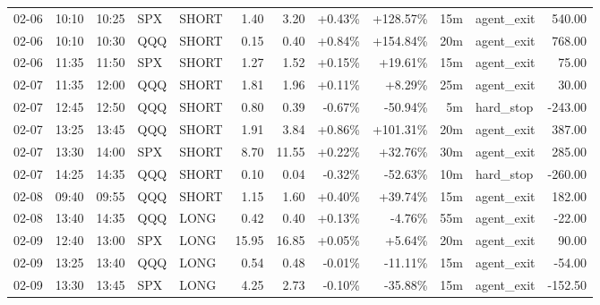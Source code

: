 \documentclass[11pt,a4paper]{article}
\begin{document}
\begin{center}
\begin{longtable}{>{\color{txtmain}}l l l l l r r r r r >{\color{txtmain}}l r}
02-06 & 10:10 & 10:25 & SPX & SHORT & 1.40 & 3.20 & \textcolor{wingreen}{+0.43\%} & \textcolor{wingreen}{+128.57\%} & 15m & agent\_exit & \textcolor{wingreen}{540.00} \\
02-06 & 10:10 & 10:30 & QQQ & SHORT & 0.15 & 0.40 & \textcolor{wingreen}{+0.84\%} & \textcolor{wingreen}{+154.84\%} & 20m & agent\_exit & \textcolor{wingreen}{768.00} \\
02-06 & 11:35 & 11:50 & SPX & SHORT & 1.27 & 1.52 & \textcolor{wingreen}{+0.15\%} & \textcolor{wingreen}{+19.61\%} & 15m & agent\_exit & \textcolor{wingreen}{75.00} \\
02-07 & 11:35 & 12:00 & QQQ & SHORT & 1.81 & 1.96 & \textcolor{wingreen}{+0.11\%} & \textcolor{wingreen}{+8.29\%} & 25m & agent\_exit & \textcolor{wingreen}{30.00} \\
02-07 & 12:45 & 12:50 & QQQ & SHORT & 0.80 & 0.39 & \textcolor{lossred}{-0.67\%} & \textcolor{lossred}{-50.94\%} & 5m & hard\_stop & \textcolor{lossred}{-243.00} \\
02-07 & 13:25 & 13:45 & QQQ & SHORT & 1.91 & 3.84 & \textcolor{wingreen}{+0.86\%} & \textcolor{wingreen}{+101.31\%} & 20m & agent\_exit & \textcolor{wingreen}{387.00} \\
02-07 & 13:30 & 14:00 & SPX & SHORT & 8.70 & 11.55 & \textcolor{wingreen}{+0.22\%} & \textcolor{wingreen}{+32.76\%} & 30m & agent\_exit & \textcolor{wingreen}{285.00} \\
02-07 & 14:25 & 14:35 & QQQ & SHORT & 0.10 & 0.04 & \textcolor{lossred}{-0.32\%} & \textcolor{lossred}{-52.63\%} & 10m & hard\_stop & \textcolor{lossred}{-260.00} \\
02-08 & 09:40 & 09:55 & QQQ & SHORT & 1.15 & 1.60 & \textcolor{wingreen}{+0.40\%} & \textcolor{wingreen}{+39.74\%} & 15m & agent\_exit & \textcolor{wingreen}{182.00} \\
02-08 & 13:40 & 14:35 & QQQ & LONG & 0.42 & 0.40 & \textcolor{wingreen}{+0.13\%} & \textcolor{lossred}{-4.76\%} & 55m & agent\_exit & \textcolor{lossred}{-22.00} \\
02-09 & 12:40 & 13:00 & SPX & LONG & 15.95 & 16.85 & \textcolor{wingreen}{+0.05\%} & \textcolor{wingreen}{+5.64\%} & 20m & agent\_exit & \textcolor{wingreen}{90.00} \\
02-09 & 13:25 & 13:40 & QQQ & LONG & 0.54 & 0.48 & \textcolor{lossred}{-0.01\%} & \textcolor{lossred}{-11.11\%} & 15m & agent\_exit & \textcolor{lossred}{-54.00} \\
02-09 & 13:30 & 13:45 & SPX & LONG & 4.25 & 2.73 & \textcolor{lossred}{-0.10\%} & \textcolor{lossred}{-35.88\%} & 15m & agent\_exit & \textcolor{lossred}{-152.50} \\

\end{longtable}
\end{center}
\end{document}
